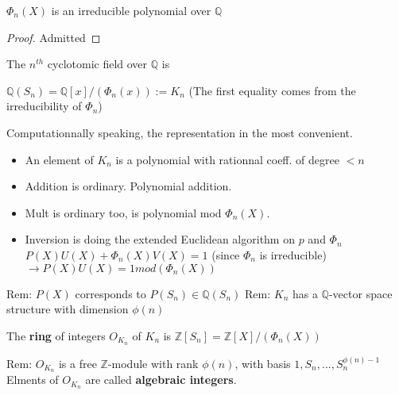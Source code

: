 \begin{proposition}
$\Phi_n(X)$ is an irreducible polynomial over $\mathbb{Q}$
\end{proposition}
\begin{proof}
Admitted
\end{proof}

\begin{definition}
The $n^{th}$ cyclotomic field over $\mathbb{Q}$ is

$\mathbb{Q}(S_n)=\mathbb{Q}[x]/(\Phi_n(x)):=K_n$ (The first equality comes from the irreducibility of $\Phi_n$)
\end{definition}

Computationnally speaking, the representation in the most convenient.
\begin{itemize}
\item An element of $K_n$ is a polynomial with rationnal coeff. of degree $< n$
\item Addition is ordinary. Polynomial addition.
\item Mult is ordinary too, is polynomial mod $\Phi_n(X)$.
\item Inversion is doing the extended Euclidean algorithm on $p$ and $\Phi_n$ $P(X)U(X)+\Phi_n(X)V(X)=1$ (since $\Phi_n$ is irreducible) $\rightarrow P(X)U(X)=1 mod (\Phi_n(X))$
\end{itemize}

Rem: $P(X)$ corresponds to $P(S_n) \in \mathbb{Q}(S_n)$
Rem: $K_n$ has a $\mathbb{Q}$-vector space structure with dimension $\phi(n)$ 

\begin{definition}
The \textbf{ring} of integers $O_{K_n}$ of $K_n$ is $\mathbb{Z}[S_n]=\mathbb{Z}[X]/(\Phi_n(X))$
\end{definition}

Rem: $O_{K_n}$ is a free $\mathbb{Z}$-module with rank $\phi(n)$, with basis $1,S_n,...,S_n^{\phi(n)-1}$
Elments of $O_{K_n}$ are called \textbf{algebraic integers}.
